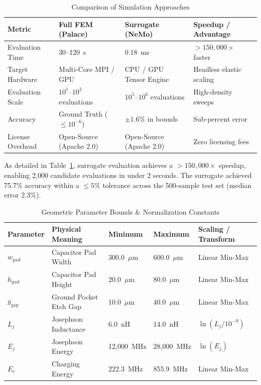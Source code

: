 \documentclass[journal,10pt,twocolumn]{IEEEtran}
\begin{document}
\begin{table}[!t]
\renewcommand{\arraystretch}{1.15}
\caption{Comparison of Simulation Approaches}
\label{tab:comparison}
\centering
\begin{tabular}{llll}
\toprule
\textbf{Metric} & \textbf{Full FEM (Palace)} & \textbf{Surrogate (NeMo)} & \textbf{Speedup / Advantage} \\
\midrule
Evaluation Time & 30--120~s & 0.18~ms & $> 150,000\times$ faster \\
Target Hardware & Multi-Core MPI / GPU & CPU / GPU Tensor Engine & Headless elastic scaling \\
Evaluation Scale & $10^1\text{--}10^2$ evaluations & $10^5\text{--}10^6$ evaluations & High-density sweeps \\
Accuracy & Ground Truth ($\le 10^{-6}$) & $\pm 1.6\%$ in bounds & Sub-percent error \\
License Overhead & Open-Source (Apache 2.0) & Open-Source (Apache 2.0) & Zero licensing fees \\
\bottomrule
\end{tabular}
\end{table}

As detailed in Table~\ref{tab:comparison}, surrogate evaluation achieves a $> 150,000\times$ speedup, enabling 2,000 candidate evaluations in under 2 seconds. The surrogate achieved 75.7\% accuracy within a $\le 5\%$ tolerance across the 500-sample test set (median error 2.3\%).

\begin{table}[!t]
\renewcommand{\arraystretch}{1.15}
\caption{Geometric Parameter Bounds \& Normalization Constants}
\label{tab:bounds}
\centering
\begin{tabular}{lllll}
\toprule
\textbf{Parameter} & \textbf{Physical Meaning} & \textbf{Minimum} & \textbf{Maximum} & \textbf{Scaling / Transform} \\
\midrule
$w_{\text{pad}}$ & Capacitor Pad Width & 300.0~$\mu$m & 600.0~$\mu$m & Linear Min-Max \\
$h_{\text{pad}}$ & Capacitor Pad Height & 20.0~$\mu$m & 80.0~$\mu$m & Linear Min-Max \\
$g_{\text{gap}}$ & Ground Pocket Etch Gap & 10.0~$\mu$m & 40.0~$\mu$m & Linear Min-Max \\
$L_j$ & Josephson Inductance & 6.0~nH & 14.0~nH & $\ln(L_j / 10^{-9})$ \\
$E_j$ & Josephson Energy & 12,000~MHz & 28,000~MHz & $\ln(E_j)$ \\
$E_c$ & Charging Energy & 222.3~MHz & 855.9~MHz & Linear Min-Max \\
\bottomrule
\end{tabular}
\end{table}
\end{document}
